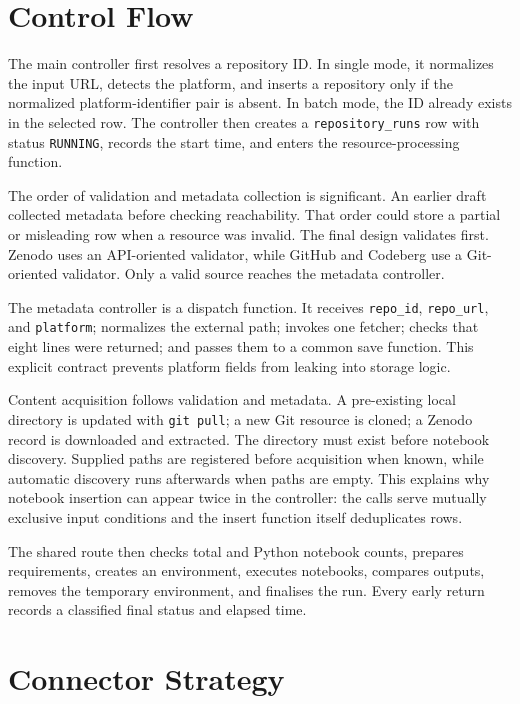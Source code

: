 \section{Control Flow}

The main controller first resolves a repository ID. In single mode, it normalizes the input URL, detects the platform, and inserts a repository only if the normalized platform-identifier pair is absent. In batch mode, the ID already exists in the selected row. The controller then creates a \texttt{repository\_runs} row with status \texttt{RUNNING}, records the start time, and enters the resource-processing function.

The order of validation and metadata collection is significant. An earlier draft collected metadata before checking reachability. That order could store a partial or misleading row when a resource was invalid. The final design validates first. Zenodo uses an API-oriented validator, while GitHub and Codeberg use a Git-oriented validator. Only a valid source reaches the metadata controller.

The metadata controller is a dispatch function. It receives \texttt{repo\_id}, \texttt{repo\_url}, and \texttt{platform}; normalizes the external path; invokes one fetcher; checks that eight lines were returned; and passes them to a common save function. This explicit contract prevents platform fields from leaking into storage logic.

Content acquisition follows validation and metadata. A pre-existing local directory is updated with \texttt{git pull}; a new Git resource is cloned; a Zenodo record is downloaded and extracted. The directory must exist before notebook discovery. Supplied paths are registered before acquisition when known, while automatic discovery runs afterwards when paths are empty. This explains why notebook insertion can appear twice in the controller: the calls serve mutually exclusive input conditions and the insert function itself deduplicates rows.

The shared route then checks total and Python notebook counts, prepares requirements, creates an environment, executes notebooks, compares outputs, removes the temporary environment, and finalises the run. Every early return records a classified final status and elapsed time.

\section{Connector Strategy}

